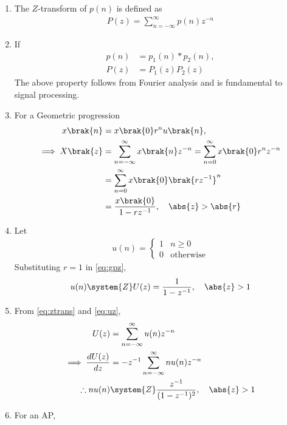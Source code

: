 \begin{enumerate}[label=\thechapter.\arabic*,ref=\thechapter.\theenumi]
\item 
	The $Z$-transform of $p(n)$ is defined as
\begin{align}
P(z) = \sum_{n=-\infty}^{\infty}p(n)z^{-n}
\label{eq:ztrans}
\end{align}
\item If 
\begin{align}
	p(n) &= p_1(n)* p_2(n),
	\\
	P(z)&=P_1(z)P_2(z)
\end{align}
The above property follows from Fourier analysis and is fundamental to signal processing. 
\item For a Geometric progression 
\begin{align}
	x\brak{n} &=x\brak{0}r^nu\brak{n},
	\\
         \implies      X\brak{z} &= \sum_{n=-\infty}^{\infty}x\brak{n}z^{-n}
               =\sum_{n=0}^{\infty}x\brak{0}r^nz^{-n}\\
                &=\sum_{n=0}^{\infty}x\brak{0}\brak{rz^{-1}}^n\\
               &= \frac{x\brak{0}}{1-rz^{-1}}, \quad \abs{z}>\abs{r} 
	       \label{eq:gpz}
\end{align}
\item Let 
\begin{align}
	u(n) = 
	\begin{cases}
		1 & n \ge 0
		\\
		0 & \text{otherwise}
	\end{cases}
\end{align}
	       Substituting $r = 1$ in \eqref{eq:gpz},
\begin{align}
	u(n) \system{Z}	U(z) = 
                \frac{1}{1-z^{-1}}, \quad \abs{z}>1
	       \label{eq:uz}
\end{align}
\item From 
\eqref{eq:ztrans}
	       and 
	       \eqref{eq:uz},
\begin{align}
	U(z) &= \sum_{n = -\infty}^{\infty} u(n) z^{-n} 
	\\
\implies	\frac{dU(z)}{dz} &= -{z}^{-1} \sum_{n = -\infty}^{\infty} nu(n) z^{-n}\\
\therefore	nu(n) &\system{Z}\frac{z^{-1}}{(1-z^{-1})^{2}}, \quad \abs{z} > 1 
	       \label{eq:uzder}
\end{align}
\item For an AP, 

\end{enumerate}
